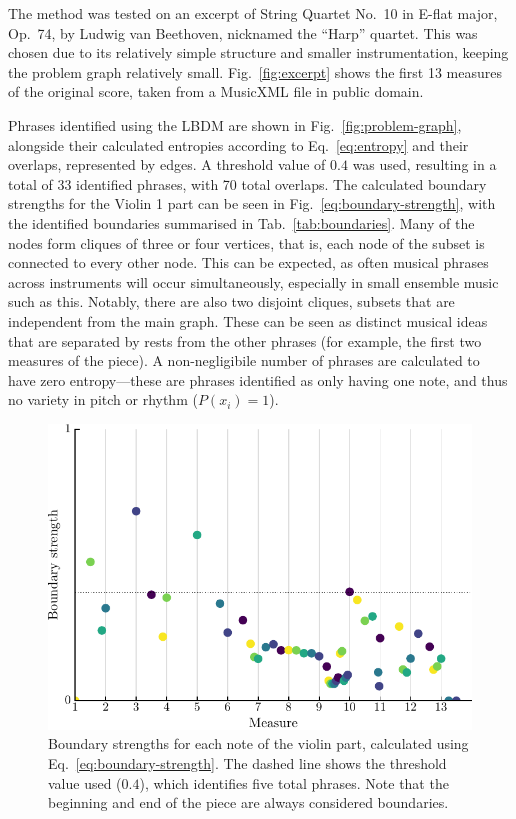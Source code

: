 \documentclass[aps,pra,10pt,twocolumn]{revtex4-2}
\begin{document}
The method was tested on an excerpt of String Quartet No.\ 10 in E-flat major, Op.\ 74, by Ludwig van Beethoven, nicknamed the ``Harp'' quartet. This was chosen due to its relatively simple structure and smaller instrumentation, keeping the problem graph relatively small. Fig.\ \ref{fig:excerpt} shows the first 13 measures of the original score, taken from a MusicXML file in public domain.

Phrases identified using the LBDM are shown in Fig.\ \ref{fig:problem-graph}, alongside their calculated entropies according to Eq.\ \ref{eq:entropy} and their overlaps, represented by edges. A threshold value of $0.4$ was used, resulting in a total of 33 identified phrases, with 70 total overlaps. The calculated boundary strengths for the Violin 1 part can be seen in Fig.\ \ref{eq:boundary-strength}, with the identified boundaries summarised in Tab.\ \ref{tab:boundaries}. Many of the nodes form cliques of three or four vertices, that is, each node of the subset is connected to every other node. This can be expected, as often musical phrases across instruments will occur simultaneously, especially in small ensemble music such as this. Notably, there are also two disjoint cliques, subsets that are independent from the main graph. These can be seen as distinct musical ideas that are separated by rests from the other phrases (for example, the first two measures of the piece). A non-negligibile number of phrases are calculated to have zero entropy—these are phrases identified as only having one note, and thus no variety in pitch or rhythm ($P(x_i)=1$).

\begin{figure}[b]
    \centering
    \includegraphics[width=\linewidth]{../Figures/boundary_offset.pdf}
    \caption{Boundary strengths for each note of the violin part, calculated using Eq.\ \ref{eq:boundary-strength}. The dashed line shows the threshold value used ($0.4$), which identifies five total phrases. Note that the beginning and end of the piece are always considered boundaries.}
    \label{fig:boundary-strengths}
\end{figure}
\end{document}
